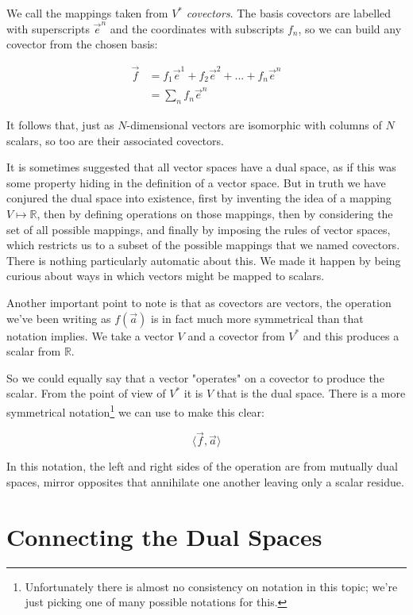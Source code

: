 We call the mappings taken from $V^*$ \textit{covectors}. The basis covectors are labelled with superscripts $\vec{e}^n$ and the coordinates with subscripts $f_n$, so we can build any covector from the chosen basis:

\begin{equation}
    \begin{split}
    \vec{f} &= f_1 \vec{e}^1 + f_2 \vec{e}^2 + ... + f_n \vec{e}^n \\
            &= \sum_n f_n \vec{e}^n
    \end{split}
\end{equation}

It follows that, just as $N$-dimensional vectors are isomorphic with columns of $N$ scalars, so too are their associated covectors.

It is sometimes suggested that all vector spaces have a dual space, as if this was some property hiding in the definition of a vector space. But in truth we have conjured the dual space into existence, first by inventing the idea of a mapping $V \mapsto \mathbb{R}$, then by defining operations on those mappings, then by considering the set of all possible mappings, and finally by imposing the rules of vector spaces, which restricts us to a subset of the possible mappings that we named covectors. There is nothing particularly automatic about this. We made it happen by being curious about ways in which vectors might be mapped to scalars.

Another important point to note is that as covectors are vectors, the operation we've been writing as $f(\vec{a})$ is in fact much more symmetrical than that notation implies. We take a vector $V$ and a covector from $V^*$ and this produces a scalar from $\mathbb{R}$. 

So we could equally say that a vector "operates" on a covector to produce the scalar. From the point of view of $V^*$ it is $V$ that is the dual space. There is a more symmetrical notation\footnote{Unfortunately there is almost no consistency on notation in this topic; we're just picking one of many possible notations for this.} we can use to make this clear:

$$\langle \vec{f},\vec{a}\rangle$$

In this notation, the left and right sides of the operation are from mutually dual spaces, mirror opposites that annihilate one another leaving only a scalar residue.

\section{Connecting the Dual Spaces}

